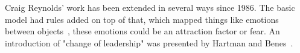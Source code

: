 Craig Reynolds' work has been extended in several ways since 1986. The basic model had rules added on top of that, which mapped things like emotions between objects~\cite{Delgado:2007}, these emotions could be an attraction factor or fear. An introduction of "change of leadership" was presented by Hartman and Benes~\cite{Hartman:2006}.